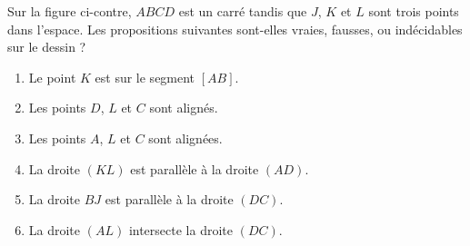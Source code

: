 
\begin{exercice}\label{exoSeconde-0091}

    \begin{multicols}{2}
    Sur la figure ci-contre, \( ABCD\) est un carré tandis que \( J\), \( K\) et \( L\) sont trois points dans l'espace. Les propositions suivantes sont-elles vraies, fausses, ou indécidables sur le dessin ?
    \begin{enumerate}
        \item
            Le point \( K\) est sur le segment \( [AB]\).
        \item
            Les points \( D\), \( L\) et \( C\) sont alignés.
        \item
            Les points \( A\), \( L\) et \( C\) sont alignées.
        \item
            La droite \( (KL)\) est parallèle à la droite \( (AD)\).
        \item
            La droite \( BJ\) est parallèle à la droite \( (DC)\).
        \item
            La droite \( (AL)\) intersecte la droite \( (DC)\).
    \end{enumerate}

\columnbreak

\begin{center}

\end{center}

    \end{multicols}
    

\end{exercice}
